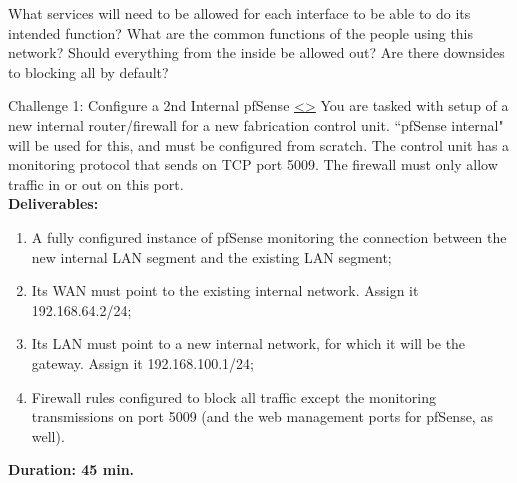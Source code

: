 \documentclass[12pt]{extarticle}
\newenvironment{instructionblock}{\Large\bgroup}{\egroup}
\newcommand{\ben}{\begin{enumerate}}
\newcommand{\een}{\end{enumerate}}
\begin{document}
\vspace{8mm}
\noindent
What services will need to be allowed for each interface to be able to do its intended function? What are the common functions of the people using this network? Should everything from the inside be allowed out? Are there downsides to blocking all by default?








\pagebreak
\begin{slide}{ Challenge 1: Configure a 2nd Internal pfSense }{ \hyperref[slide 9]{\textless}\hyperref[slide 11]{\textgreater} }
\vskip 5pt
\begin{instructionblock}
    You are tasked with setup of a new internal router/firewall for a new fabrication control unit. ``pfSense internal" will be used for this, and must be configured from scratch. The control unit has a monitoring protocol that sends on TCP port 5009. The firewall must only allow traffic in or out on this port.\\

	\textbf{\Large{Deliverables:}}
	\ben
		\item A fully configured instance of pfSense monitoring the connection between the new internal LAN segment and the existing LAN segment;
		\item Its WAN must point to the existing internal network. Assign it 192.168.64.2/24;
		\item Its LAN must point to a new internal network, for which it will be the gateway. Assign it 192.168.100.1/24;
		\item Firewall rules configured to block all traffic except the monitoring transmissions on port 5009 (and the web management ports for pfSense, as well).
	\een

  \vspace{20mm}
  \begin{center}
  \textbf{\Large{Duration: 45 min.} }
  \end{center}

\end{instructionblock}
\end{slide}
\end{document}
